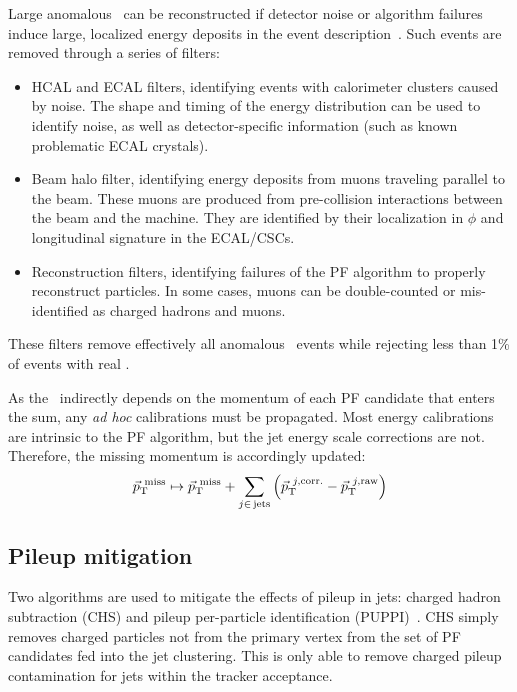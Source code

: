 Large anomalous \ptmiss~can be reconstructed if detector noise or algorithm failures induce large, localized energy deposits in the event description~\cite{cmsmet}.
Such events are removed through a series of filters:
\begin{itemize}
	\item HCAL and ECAL filters, identifying events with calorimeter clusters caused by noise. 
			The shape and timing of the energy distribution can be used to identify noise, as well as detector-specific information (such as known problematic ECAL crystals).
	\item Beam halo filter, identifying energy deposits from muons traveling parallel to the beam. 
		  These muons are produced from pre-collision interactions between the beam and the machine.
		  They are identified by their localization in $\phi$ and longitudinal signature in the ECAL/CSCs.
	\item Reconstruction filters, identifying failures of the PF algorithm to properly reconstruct particles.
		  In some cases, muons can be double-counted or mis-identified as charged hadrons and muons.
\end{itemize}
These filters remove effectively all anomalous \ptmiss~events while rejecting less than 1\% of events with real \ptmiss. 

As the \ptmiss~indirectly depends on the momentum of each PF candidate that enters the sum, any \emph{ad hoc} calibrations must be propagated.
Most energy calibrations are intrinsic to the PF algorithm, but the jet energy scale corrections are not.
Therefore, the missing momentum is accordingly updated:
\begin{equation}
	\vec{p}_\mathrm{T}^{~\mathrm{miss}} \mapsto \vec{p}_\mathrm{T}^{~\mathrm{miss}}  + \sum_{j\in\,\mathrm{jets}} \left(\vec{p}_\mathrm{T}^{~j,\mathrm{corr.}} - \vec{p}_\mathrm{T}^{~j,\mathrm{raw}}\right) 
\end{equation}

\subsection{Pileup mitigation}

Two algorithms are used to mitigate the effects of pileup in jets: charged hadron subtraction (CHS) and pileup per-particle identification (PUPPI)~\cite{puppi}.
CHS simply removes charged particles not from the primary vertex from the set of PF candidates fed into the jet clustering.
This is only able to remove charged pileup contamination for jets within the tracker acceptance.


